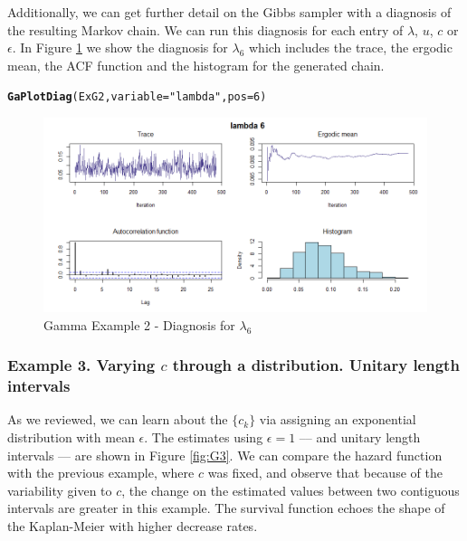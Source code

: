 \documentclass[letterpaper]{article}\usepackage[]{graphicx}\usepackage[]{color}
\makeatletter
\newcommand{\hlnum}[1]{\textcolor[rgb]{0.686,0.059,0.569}{#1}}%
\newcommand{\hlstr}[1]{\textcolor[rgb]{0.192,0.494,0.8}{#1}}%
\newcommand{\hlstd}[1]{\textcolor[rgb]{0.345,0.345,0.345}{#1}}%
\newcommand{\hlkwc}[1]{\textcolor[rgb]{0.333,0.667,0.333}{#1}}%
\newcommand{\hlkwd}[1]{\textcolor[rgb]{0.737,0.353,0.396}{\textbf{#1}}}%
\newenvironment{kframe}{%
 \def\at@end@of@kframe{}%
 \ifinner\ifhmode%
  \def\at@end@of@kframe{\end{minipage}}%
  \begin{minipage}{\columnwidth}%
 \fi\fi%
 \def\FrameCommand##1{\hskip\@totalleftmargin \hskip-\fboxsep
 \colorbox{shadecolor}{##1}\hskip-\fboxsep
     \hskip-\linewidth \hskip-\@totalleftmargin \hskip\columnwidth}%
 \MakeFramed {\advance\hsize-\width
   \@totalleftmargin\z@ \linewidth\hsize
   \@setminipage}}%
 {\par\unskip\endMakeFramed%
 \at@end@of@kframe}
\newenvironment{knitrout}{}{} %
\makeatother
\begin{document}
Additionally, we can get further detail on the Gibbs sampler with a diagnosis of the resulting Markov chain. We can run this diagnosis for each entry of $\lambda$, $u$, $c$ or $\epsilon$. In Figure \ref{fig:G2a} we show the diagnosis for $\lambda_6$ which includes the trace, the ergodic mean, the ACF function and the histogram for the generated chain.

\begin{knitrout}
\color{fgcolor}\begin{kframe}
\begin{alltt}
\hlkwd{GaPlotDiag}\hlstd{(ExG2,} \hlkwc{variable} \hlstd{=} \hlstr{"lambda"}\hlstd{,} \hlkwc{pos} \hlstd{=} \hlnum{6}\hlstd{)}
\end{alltt}
\end{kframe}
\end{knitrout}

\begin{figure}
  \centering
  \includegraphics[width=\textwidth]{G23.png}
  \caption{Gamma Example 2 - Diagnosis for $\lambda_6$}
  \label{fig:G2a}
\end{figure}

\subsubsection{Example 3. Varying $c$ through a distribution. Unitary length intervals}

As we reviewed, we can learn about the $\{c_k\}$ via assigning an exponential distribution with mean $\epsilon$. The estimates using $\epsilon = 1$ ---- and unitary length intervals ---- are shown in Figure \ref{fig:G3}. We can compare the hazard function with the previous example, where $c$ was fixed, and observe that because of the variability given to $c$, the change on the estimated values between two contiguous intervals are greater in this example. The survival function echoes the shape of the Kaplan-Meier with higher decrease rates. 
\end{document}
